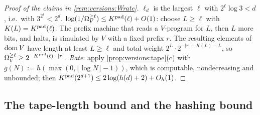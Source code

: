 \begin{proof}[Proof of the claims in \cref{rem:versions:Wrate}]
$\ell_d$ is the largest $\ell$ with $2^\ell\log3<d$, i.e.\ with $3^{2^\ell}<2^d$. \emph{$\log(1/\Omega_{V}^{\ge \ell})\le K^{\mathrm{pad}}(\ell)+O(1)$}: choose $L\ge\ell$ with $K(L)=K^{\mathrm{pad}}(\ell)$. The prefix machine that reads a $V$-program for $L$, then $L$ more bits, and halts, is simulated by $V$ with a fixed prefix $r$. The resulting elements of $\operatorname{dom} V$ have length at least $L\ge\ell$ and total weight $2^{L}\cdot2^{-|r|-K(L)-L}$, so $\Omega_{V}^{\ge \ell}\ge2^{-K^{\mathrm{pad}}(\ell)-|r|}$. \emph{Rate}: apply \cref{prop:versions:tape}(c) with $g(N):=h(\max(0,\lfloor\log N\rfloor-1))$, which is computable, nondecreasing and unbounded; then $K^{\mathrm{pad}}(2^{d+1})\le2\log(h(d)+2)+O_h(1)$.
\end{proof}

\subsection{The tape-length bound and the hashing bound}\label{app:versions:tape}

